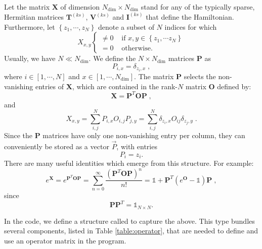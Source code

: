 Let the matrix $\bm{X}$ of dimension $N_{\mathrm{dim}} \times N_{\mathrm{dim}}$ stand for any of the typically sparse, Hermitian matrices $\bm{T}^{(ks)}$, $\bm{V}^{(ks)}$ and $\bm{I}^{(ks)}$ that define the Hamiltonian.
Furthermore, let $\left\{z_{1},\cdots, z_{N} \right\}$ denote a subset of $N$ indices
for which
\begin{equation}
X_{x,y} 
\left\{\begin{matrix}  \neq 0  &  \text{ if }   x,  y  \in \left\{ z_1, \cdots z_N \right\}\\ 
                                 = 0         &  \text{ otherwise. } 
      \end{matrix}\right.
\end{equation}
Usually, we have $N\ll N_{\text{dim}}$.
 We define the $N \times N_{\mathrm{dim}}$ matrices $\bm{P}$  as
\begin{equation}
P_{i,x}=\delta_{z_{i},x}\;,
\end{equation}
where $i \in [1,\cdots, N ]$ and $ x  \in [1,\cdots, N_{\mathrm{dim}}]$. The matrix  $\bm{P}$ selects the non-vanishing entries of $\bm{X}$, 
which are contained in the rank-$N$  matrix $\bm{O}$ defined by:
\begin{equation}\label{eqn:xeqpdop}
\bm{X} =\bm{P}^{T} \bm{O} \bm{P}\;,
\end{equation}
and 
\begin{equation}
X_{x,y} = \sum\limits_{i,j}^{N}  P_{i,x}  O_{i,j} P_{j,y}=\sum\limits_{i,j}^{N} \delta_{z_{i},x}  O_{ij} \delta_{z_{j},y} \;.
\end{equation}
Since  the  $\bm{P}$ matrices have only one non-vanishing entry per column,  they can conveniently be stored as a vector $\vec{P}$, with entries
\begin{equation}
     P_i = z_i.
\end{equation}  
There are  many useful  identities which emerge from this  structure. For example: 
\begin{equation}
	e^{\bm{X}} =  e^{\bm{P}^{T} \bm{O} \bm{P}}   = \sum_{n=0}^{\infty}  \frac{\left( \bm{P}^{T} \bm{O} \bm{P} \right)^n}{n!} = \mathds{1}+ \bm{P}^{T} \left(e^{ \bm{O} }-\mathds{1} \right) \bm{P}\;,
\end{equation}
since 
\begin{equation} 
	 \bm{P} \bm{P}^{T}= \mathds{1}_{N\times N}.
\end{equation}

In the code, we define a structure called  to capture the above. 
This type  bundles several components, listed in Table \ref{table:operator}, that are needed to define and use an operator matrix in the program.  

